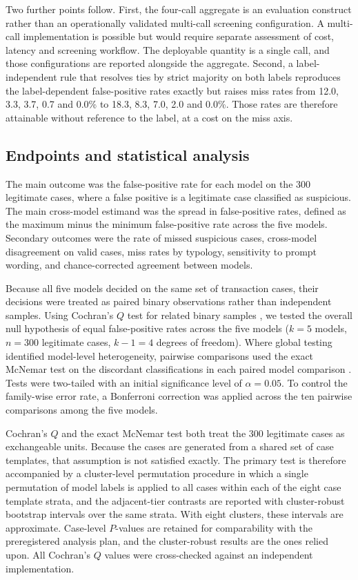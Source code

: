 \documentclass[pdflatex,sn-basic,Numbered]{sn-jnl}
\begin{document}
Two further points follow. First, the four-call aggregate is an evaluation construct rather than an operationally validated multi-call screening configuration. A multi-call implementation is possible but would require separate assessment of cost, latency and screening workflow. The deployable quantity is a single call, and those configurations are reported alongside the aggregate. Second, a label-independent rule that resolves ties by strict majority on both labels reproduces the label-dependent false-positive rates exactly but raises miss rates from 12.0, 3.3, 3.7, 0.7 and 0.0\% to 18.3, 8.3, 7.0, 2.0 and 0.0\%. Those rates are therefore attainable without reference to the label, at a cost on the miss axis.

\subsection{Endpoints and statistical analysis}

The main outcome was the false-positive rate for each model on the 300 legitimate cases, where a false positive is a legitimate case classified as suspicious. The main cross-model estimand was the spread in false-positive rates, defined as the maximum minus the minimum false-positive rate across the five models. Secondary outcomes were the rate of missed suspicious cases, cross-model disagreement on valid cases, miss rates by typology, sensitivity to prompt wording, and chance-corrected agreement between models.

Because all five models decided on the same set of transaction cases, their decisions were treated as paired binary observations rather than independent samples. Using Cochran's $Q$ test for related binary samples \cite{cochran}, we tested the overall null hypothesis of equal false-positive rates across the five models ($k=5$ models, $n=300$ legitimate cases, $k-1=4$ degrees of freedom). Where global testing identified model-level heterogeneity, pairwise comparisons used the exact McNemar test on the discordant classifications in each paired model comparison \cite{mcnemar}. Tests were two-tailed with an initial significance level of $\alpha=0.05$. To control the family-wise error rate, a Bonferroni correction was applied across the ten pairwise comparisons among the five models.

Cochran's $Q$ and the exact McNemar test both treat the 300 legitimate cases as exchangeable units. Because the cases are generated from a shared set of case templates, that assumption is not satisfied exactly. The primary test is therefore accompanied by a cluster-level permutation procedure in which a single permutation of model labels is applied to all cases within each of the eight case template strata, and the adjacent-tier contrasts are reported with cluster-robust bootstrap intervals over the same strata. With eight clusters, these intervals are approximate. Case-level $P$-values are retained for comparability with the preregistered analysis plan, and the cluster-robust results are the ones relied upon. All Cochran's $Q$ values were cross-checked against an independent implementation.
\end{document}
